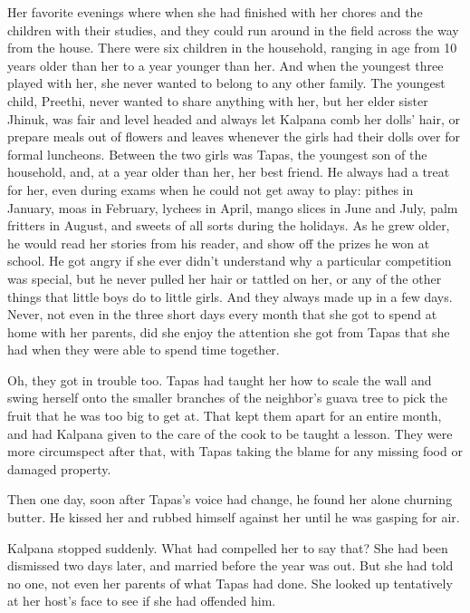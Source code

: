 \documentclass{amsart}
\begin{document}
	Her favorite evenings where when she had finished with her chores and the
	children with their studies, and they could run around in the field across the
	way from the house. There were six children in the household, ranging in age
	from 10 years older than her to a year younger than her. And when the youngest
	three played with her, she never wanted to belong to any other family. The
	youngest child, Preethi, never wanted to share anything with her, but her elder
	sister Jhinuk, was fair and level headed and always let Kalpana comb her dolls'
	hair, or prepare meals out of flowers and leaves whenever the girls had their
	dolls over for formal luncheons. Between the two girls was Tapas, the youngest
	son of the household, and, at a year older than her, her best friend. He always
	had a treat for her, even during exams when he could not get away to play:
	pithes in January, moas in February, lychees in April, mango slices in June and
	July, palm fritters in August, and sweets of all sorts during the holidays. As
	he grew older, he would read her stories from his reader, and show off the
	prizes he won at school. He got angry if she ever didn't understand why a particular
	competition was special, but he never pulled her hair or tattled on her, or any of
	the other things that little boys do to little girls. And they always made up in a 
	few days. Never, not even in the three short days every month that
	she got to spend at home with her parents, did she enjoy the attention she got
	from Tapas that she had when they were able to spend time together. 
	
	Oh, they got
	in trouble too. Tapas had taught her how to scale the wall and swing herself
	onto the smaller branches of the neighbor's guava tree to pick the fruit that he
	was too big to get at. That kept them apart for an entire month, and had Kalpana
	given to the care of the cook to be taught a lesson. They were more circumspect
	after that, with Tapas taking the blame for any missing food or damaged
	property. 
	
	Then one day, soon after Tapas's voice had change, he found her alone churning butter. 
	He kissed her and rubbed himself against her until he was gasping for air.
	
	Kalpana stopped suddenly. What had compelled her to say that? She had been
	dismissed two days later, and married before the year was out. But she had told
	no one, not even her parents of what Tapas had done. She looked up tentatively
	at her host's face to see if she had offended him. 
	
\end{document}

